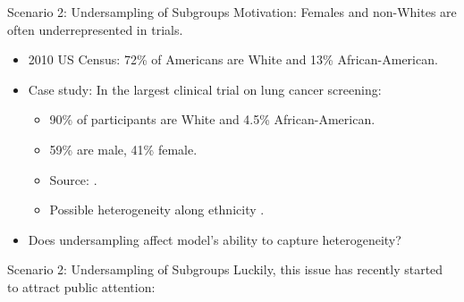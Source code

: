 \documentclass[11pt]{beamer}
\begin{document}
\begin{frame}{Scenario 2: Undersampling of Subgroups}
\alert{Motivation:} Females and non-Whites are often underrepresented in trials.\medskip
\begin{itemize}
	\item 2010 US Census: 72\% of Americans are White and 13\% African-American.\medskip
	\item Case study: In the largest clinical trial on lung cancer screening:\medskip
	\begin{itemize}\setlength\itemsep{0.5em}
	\item 90\% of participants are White and 4.5\% African-American.
	\item 59\% are male, 41\% female.
	\item Source: \cite{nlst2011}.
	\item Possible heterogeneity along ethnicity \citep{blom2020}.\bigskip
	\end{itemize}
\item[\ding{212}] \alert{Does undersampling affect model's ability to capture heterogeneity?}
\end{itemize}
\end{frame}


\begin{frame}{Scenario 2: Undersampling of Subgroups}
Luckily, this issue has recently started to attract public attention:
	\begin{figure}
	\end{figure}
\end{frame}
\end{document}
